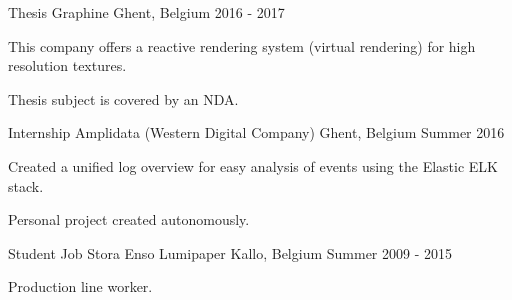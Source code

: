 \begin{cventries}
\cventry
{Thesis} %
{Graphine} %
{Ghent, Belgium} %
{2016 - 2017} %
{ %
\begin{cvitems}
\item {This company offers a reactive rendering system (virtual rendering) for high resolution textures.}
\item {Thesis subject is covered by an NDA.}
\end{cvitems}
}


\cventry
{Internship} %
{Amplidata (Western Digital Company)} %
{Ghent, Belgium} %
{Summer 2016} %
{ %
\begin{cvitems}
\item {Created a unified log overview for easy analysis of events using the Elastic ELK stack.}
\item {Personal project created autonomously.}
\end{cvitems}
}


\cventry
{Student Job} %
{Stora Enso Lumipaper} %
{Kallo, Belgium} %
{Summer 2009 - 2015} %
{ %
\begin{cvitems}
\item {Production line worker.}
\end{cvitems}
}




\end{cventries}